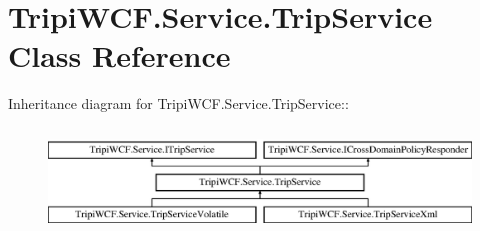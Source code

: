 \hypertarget{class_tripi_w_c_f_1_1_service_1_1_trip_service}{
\section{TripiWCF.Service.TripService Class Reference}
\label{class_tripi_w_c_f_1_1_service_1_1_trip_service}
}
Inheritance diagram for TripiWCF.Service.TripService::\begin{figure}[H]
\begin{center}
\leavevmode
\includegraphics[height=2.80936cm]{class_tripi_w_c_f_1_1_service_1_1_trip_service}
\end{center}
\end{figure}
